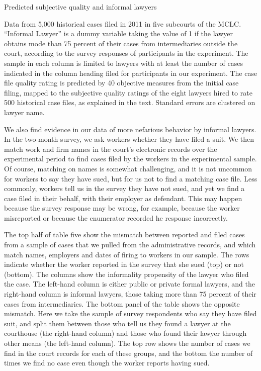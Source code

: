 \documentclass[oneside,12pt]{article}
\begin{document}


\begin{table}[!ht]
    \caption{Predicted subjective quality and informal lawyers} %
    \label{tab:4}
    \center
    \notesize{}
    \begin{figurenotes}
    Data from 5,000 historical cases filed in 2011 in five subcourts of the MCLC. “Informal Lawyer” is a dummy variable taking the value of 1 if the lawyer obtains mode than 75 percent of their cases from intermediaries outside the court, according to the survey responses of participants in the experiment. The sample in each column is limited to lawyers with at least the number of cases indicated in the column heading filed for participants in our experiment. The case file quality rating is predicted by 40 objective measures from the initial case filing, mapped to the subjective quality ratings of the eight lawyers hired to rate 500 historical case files, as explained in the text. Standard errors are clustered on lawyer name.
    \end{figurenotes}
  
\end{table}

We also find evidence in our data of more nefarious behavior by informal lawyers. In the two-month survey, we ask workers whether they have filed a suit. We then match work and firm names in the court’s electronic records over the experimental period to find cases filed by the workers in the experimental sample. Of course, matching on names is somewhat challenging, and it is not uncommon for workers to say they have sued, but for us not to find a matching case file. Less commonly, workers tell us in the survey they have not sued, and yet we find a case filed in their behalf, with their employer as defendant. This may happen because the survey response may be wrong, for example, because the worker misreported or because the enumerator recorded he response incorrectly. 

The top half of table five show the mismatch between reported and filed cases from a sample of cases that we pulled from the administrative records, and which match names, employers and dates of firing to workers in our sample. The rows indicate whether the worker reported in the survey that she sued (top) or not (bottom). The columns show the informality propensity of the lawyer who filed the case. The left-hand column is either public or private formal lawyers, and the right-hand column is informal lawyers, those taking more than 75 percent of their cases from intermediaries. The bottom panel of the table shows the opposite mismatch. Here we take the sample of survey respondents who say they have filed suit, and split them between those who tell us they found a lawyer at the courthouse (the right-hand column) and those who found their lawyer through other means (the left-hand column). The top row shows the number of cases we find in the court records for each of these groups, and the bottom the number of times we find no case even though the worker reports having sued. 
\end{document}
